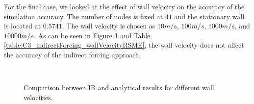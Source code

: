 For the final case, we looked at the effect of wall velocity on the accuracy of the simulation accuracy. The number of nodes is fixed at $41$ and the stationary wall is located at $0.5741$. The wall velocity is chosen as $10 m/s$, $100 m/s$, $1000 m/s$, and $10000 m/s$. As can be seen in Figure \ref{fig:C3_indirectForcing_wallVelocity} and Table \ref{table:C3_indirectForcing_wallVelocityRSME}, the wall velocity does not affect the accuracy of the indirect forcing approach.

\begin{figure}[H]
    \centering
    \quad
    \\
    \quad
    \caption{Comparison between IB and analytical results for different wall velocities.}
    \label{fig:C3_indirectForcing_wallVelocity}
\end{figure}


